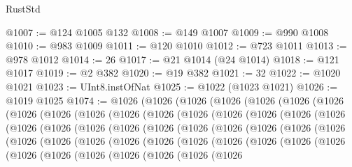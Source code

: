 \begin{lexlean}{RustStd}
\begin{coremodule}
{\begin{coremodule}
{{{{{{{{{{{{{{{{{{{{{{{{{{{{{{{{{{{{{@1007 := @124 @1005 @132
@1008 := @149 @1007
@1009 := @990 @1008
@1010 := @983 @1009
@1011 := @120 @1010
@1012 := @723 @1011
@1013 := @978 @1012
@1014 := 26
@1017 := @21 @1014 (@24 @1014)
@1018 := @121 @1017
@1019 := @2 @382
@1020 := @19 @382
@1021 := 32
@1022 := @1020 @1021
@1023 := UInt8.instOfNat
@1025 := @1022 (@1023 @1021)
@1026 := @1019 @1025
@1074 := @1026
    (@1026
      (@1026
        (@1026
          (@1026
            (@1026
              (@1026
                (@1026
                  (@1026
                    (@1026
                      (@1026
                        (@1026
                          (@1026
                            (@1026
                              (@1026
                                (@1026
                                  (@1026
                                    (@1026
                                      (@1026
                                        (@1026
                                          (@1026
                                            (@1026
                                              (@1026
                                                (@1026
                                                  (@1026
                                                    (@1026
                                                      (@1026
                                                        (@1026
                                                          (@1026
                                                            (@1026
                                                              (@1026
                                                                (@1026
                                                                  (@1026
                                                                    (@1026
                                                                      (@1026
                                                                        (@1026
                                                                          (@1026
                                                                            (@1026
                                                                              (@1026
                                                                                (@1026
                                                                                  (@1026
                                                                                    (@1026
                                                                                      (@1026
                                                                                        (@1026
}}}}}}}}}}}}}}}}}}}}}}}}}}}}}}}}}}}}}
\end{coremodule}}
\end{coremodule}
\end{lexlean}
